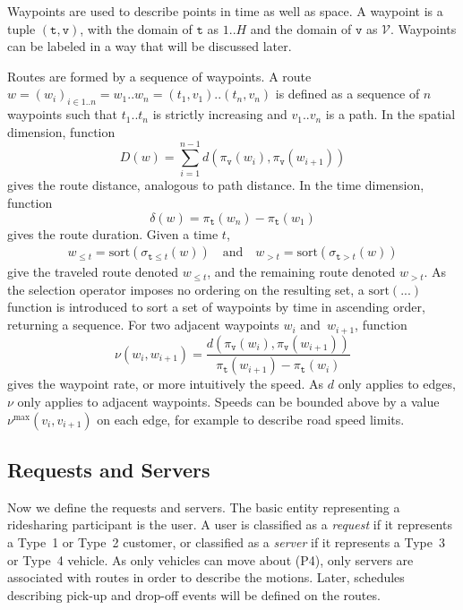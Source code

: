 Waypoints are used to describe points in time as well as space.
A waypoint is a tuple $(\texttt{t},\texttt{v})$, with the
domain of $\texttt{t}$ as $1..H$ and the domain of $\texttt{v}$ as
$\mathcal{V}$. Waypoints can be labeled in a way that will be
discussed later.

Routes are formed by a sequence of waypoints. A route
$w=(w_i)_{i\in 1..n}=w_1..w_n=(t_1,v_1)..(t_n,v_n)$
is defined as a sequence of $n$ waypoints such that
$t_1..t_n$ is strictly increasing and $v_1..v_n$ is a path.
In the spatial dimension, function
$$D(w)=\sum_{i=1}^{n-1}d(\pi_\texttt{v}(w_i),\pi_\texttt{v}(w_{i+1}))$$
gives the route distance, analogous to path distance.
In the time dimension, function
$$\delta(w)=\pi_\texttt{t}(w_n)-\pi_\texttt{t}(w_1)$$
gives the route duration.
Given a time $t$,
\begin{align*}
w_{\leq t}=\textrm{sort}(\sigma_{\texttt{t}\leq t}(w))\quad\textrm{and}\quad
w_{>t}=\textrm{sort}(\sigma_{\texttt{t}>t}(w))
\end{align*}
give the traveled route denoted $w_{\leq t}$, and the remaining
route denoted $w_{>t}$. As the selection operator imposes no ordering on the resulting
set, a $\textrm{sort}(...)$ function is introduced to
sort a set of waypoints by time in ascending order, returning a sequence.
For two adjacent waypoints $w_i$ and~$w_{i+1}$, function
$$\nu(w_i,w_{i+1})=\frac{d(\pi_\texttt{v}(w_i),\pi_\texttt{v}(w_{i+1}))}
{\pi_\texttt{t}(w_{i+1})-\pi_\texttt{t}(w_i)}$$ gives the
waypoint rate, or more intuitively the speed.
As $d$ only applies to edges, $\nu$ only applies to adjacent waypoints.
Speeds can be bounded above by a value $\nu^\textrm{max}(v_i,v_{i+1})$ on each edge,
for example to describe road speed limits.

\subsection{Requests and Servers}
\label{ch:1:sec:requests-and-servers}
Now we define the requests and servers.
The basic entity representing a ridesharing participant is the user.  A
user is classified as a \emph{request} if it represents a Type~1 or Type~2
customer, or classified as a \emph{server} if it represents a Type~3 or Type~4
vehicle. As only vehicles can move about (P4), only servers are associated with
routes in order to describe the motions. Later, schedules describing
pick-up and drop-off events will be defined on the routes.

